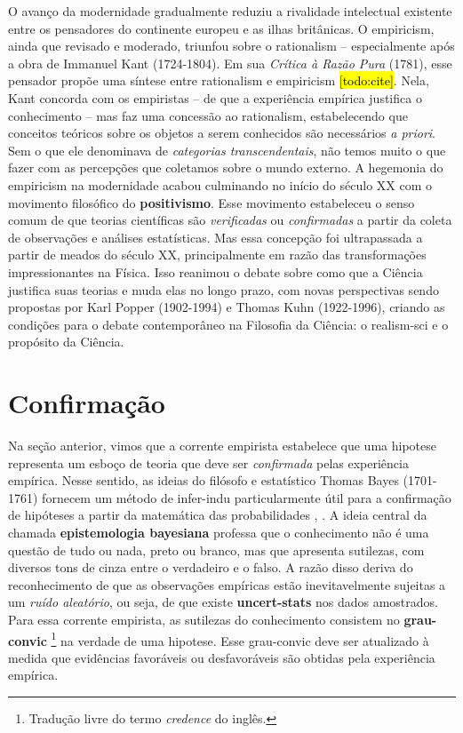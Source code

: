 \documentclass[./main.tex]{subfiles}
\begin{document}
\par O avanço da modernidade gradualmente reduziu a rivalidade intelectual existente entre os pensadores do continente europeu e as ilhas britânicas. O \gls{empiricism}, ainda que revisado e moderado, triunfou sobre o \gls{rationalism} -- especialmente após a obra de Immanuel Kant (1724-1804). Em sua \textit{Crítica à Razão Pura} (1781), esse pensador propõe uma síntese entre \gls{rationalism} e \gls{empiricism} \hl{[todo:cite]}. Nela, Kant concorda com os empiristas -- de que a experiência empírica justifica o conhecimento -- mas faz uma concessão ao \gls{rationalism}, estabelecendo que conceitos teóricos sobre os objetos a serem conhecidos são necessários \textit{a priori}. Sem o que ele denominava de \textit{categorias transcendentais}, não temos muito o que fazer com as percepções que coletamos sobre o mundo externo. A hegemonia do \gls{empiricism} na modernidade  acabou culminando no início do século XX com o movimento filosófico do \textbf{\gls{positivismo}}. Esse movimento estabeleceu o senso comum de que teorias científicas são \textit{verificadas} ou \textit{confirmadas} a partir da coleta de observações e análises estatísticas. Mas essa concepção foi ultrapassada a partir de meados do século XX, principalmente em razão das transformações impressionantes na Física. Isso reanimou o debate sobre como que a Ciência justifica suas teorias e muda elas no longo prazo, com novas perspectivas sendo propostas por Karl Popper (1902-1994) e Thomas Kuhn (1922-1996), criando as condições para o debate contemporâneo na Filosofia da Ciência: o \gls{realism-sci} e o propósito da Ciência.

\section{Confirmação} \label{sec:epis:bayes}

\par Na seção anterior, vimos que a corrente empirista estabelece que uma \gls{hipotese} representa um esboço de \gls{teoria} que deve ser \textit{confirmada} pelas experiência empírica. Nesse sentido, as ideias do filósofo e estatístico Thomas Bayes (1701-1761) fornecem um método de \gls{infer-indu} particularmente útil para a confirmação de hipóteses a partir da matemática das probabilidades \cite{sep-epistemology-bayesian}, \cite{sprenger2019}. A ideia central da chamada \textbf{epistemologia bayesiana} professa que o conhecimento não é uma questão de tudo ou nada, preto ou branco, mas que apresenta sutilezas, com diversos tons de cinza entre o verdadeiro e o falso. A razão disso deriva do reconhecimento de que as observações empíricas estão inevitavelmente sujeitas a um \textit{ruído aleatório}, ou seja, de que existe \textbf{\gls{uncert-stats}} nos dados amostrados. Para essa corrente empirista, as sutilezas do conhecimento consistem no \textbf{\gls{grau-convic}} \footnote{Tradução livre do termo \textit{credence} do inglês.} na verdade de uma \gls{hipotese}. Esse \gls{grau-convic} deve ser atualizado à medida que evidências favoráveis ou desfavoráveis são obtidas pela experiência empírica. 
\end{document}
